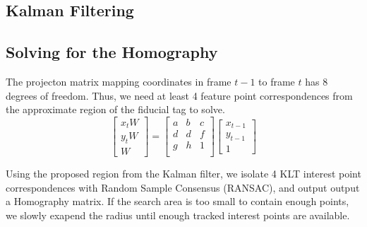 \documentclass[12pt]{article}
\begin{document}
\subsection{Kalman Filtering}

\subsection{Solving for the Homography}
The projecton matrix mapping coordinates in frame $t-1$ to frame $t$ has 8 degrees of freedom. Thus, we need at least 4 feature point correspondences from the approximate region of the fiducial tag to solve. 
\begin{equation}
\begin{bmatrix}
x_{t}W\\
y_{t}W\\
W
\end{bmatrix}
= \begin{bmatrix}
a&b&c\\
d&d&f\\
g&h&1\\
\end{bmatrix}
\begin{bmatrix}
x_{t-1}\\
y_{t-1}\\
1
\end{bmatrix}
\end{equation}

Using the proposed region from the Kalman filter, we isolate 4 KLT interest point correspondences  with Random Sample Consensus (RANSAC), and output output a Homography matrix. If the search area is too small to contain enough points, we slowly exapend the radius until enough tracked interest points are available.
\end{document}
